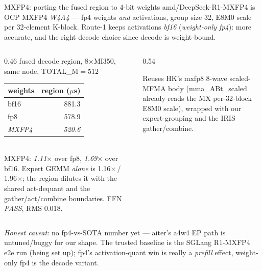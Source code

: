 \documentclass[pdf,aspectratio=169]{beamer}
\newcommand{\empy}[1]{{\color{darkorange}\emph{#1}}}
\newcommand{\empr}[1]{{\color{cardinalred}\emph{#1}}}
\newcommand{\examplebox}[2]{%
\begin{tcolorbox}[colframe=darkcardinal,colback=boxgray,title={#1}]
#2
\end{tcolorbox}}
\newcommand{\mc}[1]{{\ttfamily\small #1}}
\begin{document}
\begin{frame}{MXFP4: porting the fused region to 4-bit weights}
\small
\mc{amd/DeepSeek-R1-MXFP4} is OCP MXFP4 \empr{W4A4} --- fp4 weights \emph{and} activations, group size 32, E8M0 scale per 32-element K-block. Route-1 keeps activations \empy{bf16} (\empy{weight-only fp4}): more accurate, and the right decode choice since decode is weight-bound.
\vspace{0.5ex}
\begin{columns}
\begin{column}{0.46\textwidth}
\centering\footnotesize fused decode region, 8$\times$MI350, same node, TOTAL\_M$=512$
\begin{tabular}{l r}
\toprule
weights & region ($\mu$s) \\
\midrule
bf16  & 881.3 \\
fp8   & 578.9 \\
\empy{MXFP4} & \empr{520.6} \\
\bottomrule
\end{tabular}
\vspace{0.6ex}\\
\footnotesize MXFP4: \empr{1.11$\times$} over fp8, \empy{1.69$\times$} over bf16. Expert GEMM \emph{alone} is 1.16$\times$\,/\,1.96$\times$; the region dilutes it with the shared act-dequant and the gather/act/combine boundaries. FFN \empy{PASS}, RMS 0.018.
\end{column}
\begin{column}{0.54\textwidth}
\examplebox{The GEMM already exists --- the work is the MX wiring}{\small
Reuses HK's mxfp8 8-wave scaled-MFMA body (\mc{mma\_ABt\_scaled} already reads the MX per-32-block E8M0 scale), wrapped with our expert-grouping and the IRIS gather/combine.}
\end{column}
\end{columns}
\vspace{0.6ex}

{\footnotesize \empy{Honest caveat:} no fp4-vs-SOTA number yet --- aiter's \mc{a4w4} EP path is untuned/buggy for our shape. The trusted baseline is the SGLang R1-MXFP4 e2e run (being set up); fp4's activation-quant win is really a \empr{prefill} effect, weight-only fp4 is the decode variant.}
\end{frame}
\end{document}
